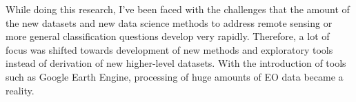 While doing this research, I've been faced with the challenges that the amount of the new datasets and new data science methods to address remote sensing or more general classification questions develop very rapidly. Therefore, a lot of focus was shifted towards development of new methods and exploratory tools instead of derivation of new higher-level datasets. With the introduction of tools such as Google Earth Engine, processing of huge amounts of EO data became a reality. 

\begin{comment}

\subsection{Estimation of water level changes from satellite altimetry}
\url{https://www.pecad.fas.usda.gov/cropexplorer/global_reservoir/}
\url{http://dahiti.dgfi.tum.de/en/}
\url{http://www.legos.obs-mip.fr/en/soa/hydrologie/hydroweb/}

... cross-validation, recnostruction of bathymetry (accuracy?)

\subsection{Segmentation of multi-spectral images using unsupervised methods}
Discuss the main issues related to unsupervised segmentation and how it can be used to improve multi-spectral image classification (dimensionality reduction, speed, bandwidth).

\begin{figure}[H]
	\centering
	\texttt{[image: 01.5-unsupervised/figures/superpixels15m]}
	\caption{Original 30m resolution image (left), resampled with bicubic method to 15m and segmented (middle), and clustered, showing average values and centroids for superpixels (right)}
\end{figure}

\subsection{Surface water detection using a mix of graph-cuts and Bayesian methods}
Define energy function to detect water.

\begin{figure}[H]
	\centering
	\texttt{[image: 01.5-unsupervised/figures/slic-graph-cuts]}
	\caption{Example of application of a simple graph-cut method to discriminate surface water from segmented image}
\end{figure}

\end{comment}

